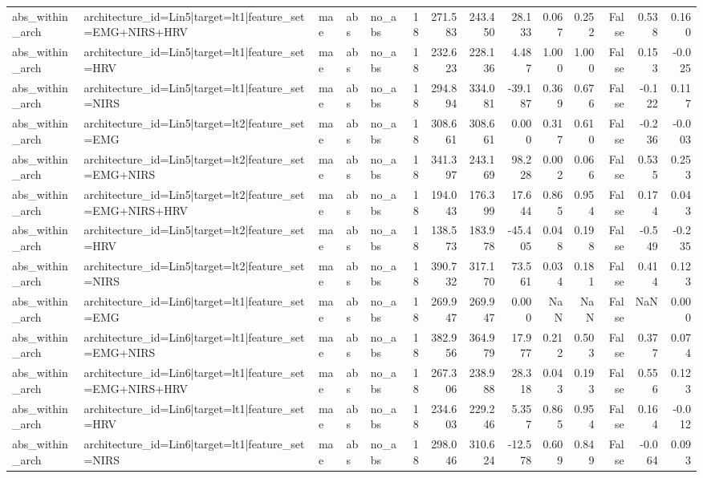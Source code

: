 \begin{table}
\begin{tabular}{lllllrrrrrrrrr}
abs_within_arch & architecture_id=Lin5|target=lt1|feature_set=EMG+NIRS+HRV & mae & abs & no_abs & 18 & 271.583 & 243.450 & 28.133 & 0.067 & 0.252 & False & 0.538 & 0.160 \\
abs_within_arch & architecture_id=Lin5|target=lt1|feature_set=HRV & mae & abs & no_abs & 18 & 232.623 & 228.136 & 4.487 & 1.000 & 1.000 & False & 0.153 & -0.025 \\
abs_within_arch & architecture_id=Lin5|target=lt1|feature_set=NIRS & mae & abs & no_abs & 18 & 294.894 & 334.081 & -39.187 & 0.369 & 0.676 & False & -0.122 & 0.117 \\
abs_within_arch & architecture_id=Lin5|target=lt2|feature_set=EMG & mae & abs & no_abs & 18 & 308.661 & 308.661 & 0.000 & 0.317 & 0.610 & False & -0.236 & -0.003 \\
abs_within_arch & architecture_id=Lin5|target=lt2|feature_set=EMG+NIRS & mae & abs & no_abs & 18 & 341.397 & 243.169 & 98.228 & 0.002 & 0.066 & False & 0.535 & 0.253 \\
abs_within_arch & architecture_id=Lin5|target=lt2|feature_set=EMG+NIRS+HRV & mae & abs & no_abs & 18 & 194.043 & 176.399 & 17.644 & 0.865 & 0.954 & False & 0.174 & 0.043 \\
abs_within_arch & architecture_id=Lin5|target=lt2|feature_set=HRV & mae & abs & no_abs & 18 & 138.573 & 183.978 & -45.405 & 0.048 & 0.198 & False & -0.549 & -0.235 \\
abs_within_arch & architecture_id=Lin5|target=lt2|feature_set=NIRS & mae & abs & no_abs & 18 & 390.732 & 317.170 & 73.561 & 0.034 & 0.181 & False & 0.414 & 0.123 \\
abs_within_arch & architecture_id=Lin6|target=lt1|feature_set=EMG & mae & abs & no_abs & 18 & 269.947 & 269.947 & 0.000 & NaN & NaN & False & NaN & 0.000 \\
abs_within_arch & architecture_id=Lin6|target=lt1|feature_set=EMG+NIRS & mae & abs & no_abs & 18 & 382.956 & 364.979 & 17.977 & 0.212 & 0.503 & False & 0.377 & 0.074 \\
abs_within_arch & architecture_id=Lin6|target=lt1|feature_set=EMG+NIRS+HRV & mae & abs & no_abs & 18 & 267.306 & 238.988 & 28.318 & 0.043 & 0.193 & False & 0.556 & 0.123 \\
abs_within_arch & architecture_id=Lin6|target=lt1|feature_set=HRV & mae & abs & no_abs & 18 & 234.603 & 229.246 & 5.357 & 0.865 & 0.954 & False & 0.164 & -0.012 \\
abs_within_arch & architecture_id=Lin6|target=lt1|feature_set=NIRS & mae & abs & no_abs & 18 & 298.046 & 310.624 & -12.578 & 0.609 & 0.849 & False & -0.064 & 0.093 \\

\end{tabular}
\end{table}
